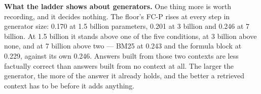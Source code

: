 \textbf{What the ladder shows about generators.} One thing more is worth recording, and it
decides nothing. The floor's FC-P rises at every step in generator size: 0.170 at 1.5 billion
parameters, 0.201 at 3 billion and 0.246 at 7 billion. At 1.5 billion it stands above one of the
five conditions, at 3 billion above none, and at 7 billion above two --- BM25 at 0.243 and the
formula block at 0.229, against its own 0.246. Answers built from those two contexts are less
factually correct than answers built from no context at all. The larger the generator, the more of
the answer it already holds, and the better a retrieved context has to be before it adds anything.
